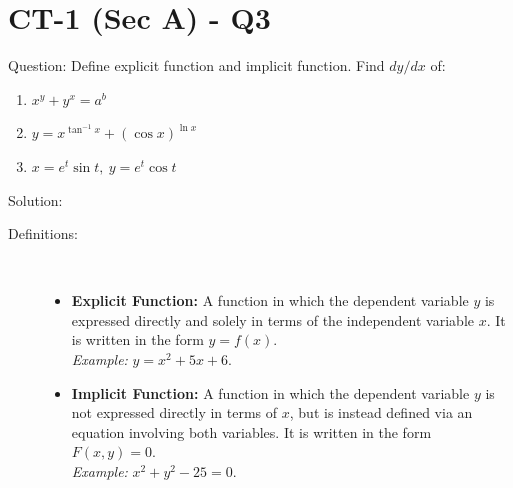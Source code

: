 \documentclass[11pt, a4paper]{article}
\begin{document}
\section*{CT-1 (Sec A) - Q3}

Question:
Define explicit function and implicit function. Find $dy/dx$ of:
\begin{enumerate}[label=(\roman*)]
    \item $x^y + y^x = a^b$
    \item $y = x^{\tan^{-1}x} + (\cos x)^{\ln x}$
    \item $x = e^t \sin t, \ y = e^t \cos t$
\end{enumerate}

Solution:

\begin{description}
    \item[Definitions:] \ 
    \begin{itemize}
        \item \textbf{Explicit Function:} A function in which the dependent variable $y$ is expressed directly and solely in terms of the independent variable $x$. It is written in the form $y = f(x)$. \\
        \textit{Example:} $y = x^2 + 5x + 6$.
        \item \textbf{Implicit Function:} A function in which the dependent variable $y$ is not expressed directly in terms of $x$, but is instead defined via an equation involving both variables. It is written in the form $F(x, y) = 0$. \\
        \textit{Example:} $x^2 + y^2 - 25 = 0$.
    \end{itemize}
\end{description}
\end{document}
